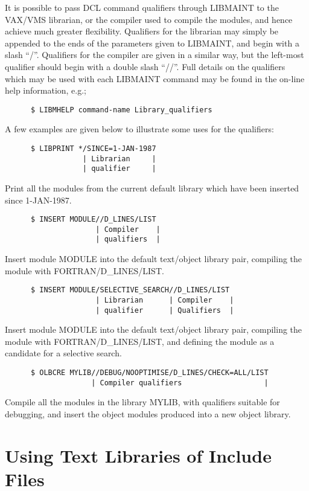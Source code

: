 It is possible to pass DCL command qualifiers through LIBMAINT
to the VAX/VMS librarian, or the compiler used to compile the
modules, and hence achieve much greater flexibility.
Qualifiers for the librarian may simply be appended
to the ends of the parameters given to LIBMAINT, and begin
with a slash ``/''.
Qualifiers for the compiler are given in a similar way,
but the left-most qualifier should begin with a double slash
``//''.
Full details on the qualifiers which may be used with
each LIBMAINT command may be found in the on-line help
information, e.g.;
\begin{verbatim}
      $ LIBMHELP command-name Library_qualifiers
\end{verbatim}
A few examples are given below to illustrate some
uses for the qualifiers:
\begin{verbatim}
      $ LIBPRINT */SINCE=1-JAN-1987
                  | Librarian     |
                  | qualifier     |
\end{verbatim}
Print all the modules from the current default library which
have been inserted since 1-JAN-1987.
\begin{verbatim}
      $ INSERT MODULE//D_LINES/LIST
                     | Compiler    |
                     | qualifiers  |
\end{verbatim}
Insert module MODULE into the default text/object library pair,
compiling the module with FORTRAN/D\_LINES/LIST.
\begin{verbatim}
      $ INSERT MODULE/SELECTIVE_SEARCH//D_LINES/LIST
                     | Librarian      | Compiler    |
                     | qualifier      | Qualifiers  |
\end{verbatim}
Insert module MODULE into the default text/object library pair,
compiling the module with FORTRAN/D\_LINES/LIST, and defining
the module as a candidate for a selective search.
\begin{verbatim}
      $ OLBCRE MYLIB//DEBUG/NOOPTIMISE/D_LINES/CHECK=ALL/LIST
                    | Compiler qualifiers                   |
\end{verbatim}
Compile all the modules in the library MYLIB, with qualifiers suitable
for debugging, and insert the object modules produced into a new object
library.

\section{Using Text Libraries of Include Files}


